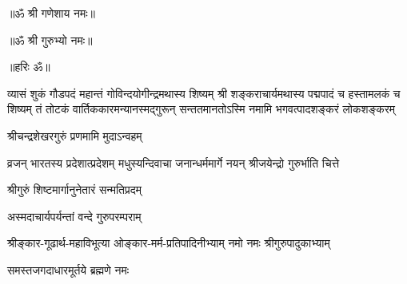 

\centerline{॥ॐ श्री गणेशाय नमः॥}
\centerline{॥ॐ श्री गुरुभ्यो नमः॥}
\centerline{॥हरिः ॐ॥}


\setlength{\shlokaspaceskip}{0pt}
%
{व्यासं शुकं गौडपदं महान्तं गोविन्दयोगीन्द्रमथास्य शिष्यम्}%
{श्री शङ्कराचार्यमथास्य पद्मपादं च हस्तामलकं च शिष्यम्}%
{तं तोटकं वार्तिककारमन्यानस्मद्गुरून् सन्ततमानतोऽस्मि}%
\setlength{\shlokaspaceskip}{24pt}
{नमामि भगवत्पादशङ्करं लोकशङ्करम्}

{श्रीचन्द्रशेखरगुरुं प्रणमामि मुदाऽन्वहम्}

{व्रजन् भारतस्य प्रदेशात्प्रदेशम्}
{मधुस्यन्दिवाचा जनान्धर्ममार्गे}
{नयन् श्रीजयेन्द्रो गुरुर्भाति चित्ते}

{श्रीगुरुं शिष्टमार्गानुनेतारं सन्मतिप्रदम्}

{अस्मदाचार्यपर्यन्तां वन्दे गुरुपरम्पराम्}

{श्रीङ्कार-गूढार्थ-महाविभूत्या}
{ओङ्कार-मर्म-प्रतिपादिनीभ्याम्}
{नमो नमः श्रीगुरुपादुकाभ्याम्}

{समस्तजगदाधारमूर्तये ब्रह्मणे नमः}
